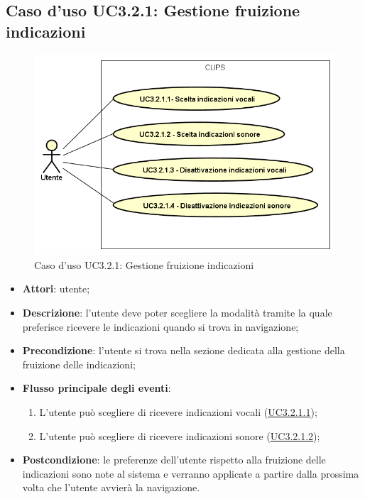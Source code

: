 \documentclass[../AnalisiDeiRequisiti.tex]{subfiles}
\begin{document}
\subsection{Caso d'uso UC3.2.1: Gestione fruizione indicazioni}

        \begin{figure}[!h]
            \centering
            \includegraphics[scale=0.95, width=\textwidth]{img/UC3-2-1.png}
            \caption{Caso d'uso UC3.2.1: Gestione fruizione indicazioni}\label{fig:UC3.2.1} 
        \end{figure}
\begin{itemize}
\item \textbf{Attori}: utente;
\item \textbf{Descrizione}: l'utente deve poter scegliere la modalità tramite la quale preferisce ricevere le indicazioni quando si trova in navigazione; 
      \item \textbf{Precondizione}: l'utente si trova nella sezione dedicata alla gestione della fruizione delle indicazioni;

        \item \textbf{Flusso principale degli eventi}:
          \begin{enumerate}
          \item L'utente può scegliere di ricevere indicazioni vocali (\hyperlink{UC3.2.1.1}{UC3.2.1.1});
          \item L'utente può scegliere di ricevere indicazioni sonore (\hyperlink{UC3.2.1.2}{UC3.2.1.2});

      \end{enumerate}
    \item \textbf{Postcondizione}: le preferenze dell'utente rispetto alla fruizione delle indicazioni sono note al sistema e verranno applicate a partire dalla prossima volta che l'utente avvierà la navigazione.
  \end{itemize}
\hypertarget{UC3.2.1.1}{}
\end{document}

